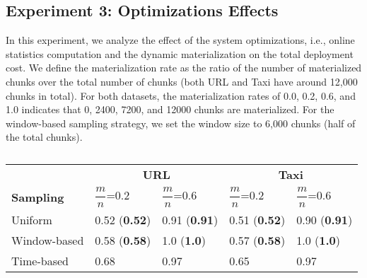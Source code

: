 \subsection{Experiment 3: Optimizations Effects}
In this experiment, we analyze the effect of the system optimizations, i.e., online statistics computation and the dynamic materialization on the total deployment cost.
We define the materialization rate  as the ratio of the number of materialized chunks over the total number of chunks (both URL and Taxi have around 12,000 chunks in total).
For both datasets, the materialization rates of 0.0, 0.2, 0.6, and 1.0 indicates that 0, 2400, 7200, and 12000 chunks are materialized.
For the window-based sampling strategy, we set the window size to 6,000 chunks (half of the total chunks).
\begin{table}[!h]
 \vspace{-5pt}
 \small
\begin{tabular}{lllll}
\hline
& \multicolumn{2}{c}{\textbf{URL}}  & \multicolumn{2}{c}{\textbf{Taxi}} \\
 \cmidrule(lr){2-3} \cmidrule(lr){4-5} 
\textbf{Sampling}  & \multicolumn{1}{l}{$\dfrac{m}{n}$=0.2} & \multicolumn{1}{l}{$\dfrac{m}{n}$=0.6} 
 &  \multicolumn{1}{l}{$\dfrac{m}{n}$=0.2} & \multicolumn{1}{l}{$\dfrac{m}{n}$=0.6}  \\
\hline
Uniform      	&  0.52 (\textbf{0.52}) & 0.91 (\textbf{0.91}) & 0.51 (\textbf{0.52}) & 0.90 (\textbf{0.91})\\
Window-based &  0.58 (\textbf{0.58}) 	& 1.0 (\textbf{1.0}) & 0.57 (\textbf{0.58}) & 1.0 (\textbf{1.0}) \\
Time-based &   0.68 	&  0.97 & 0.65 & 0.97 \\ \hline      
\end{tabular}
\caption{}
 \vspace{-20pt}
\label{table-empirical-mu}
\end{table}

